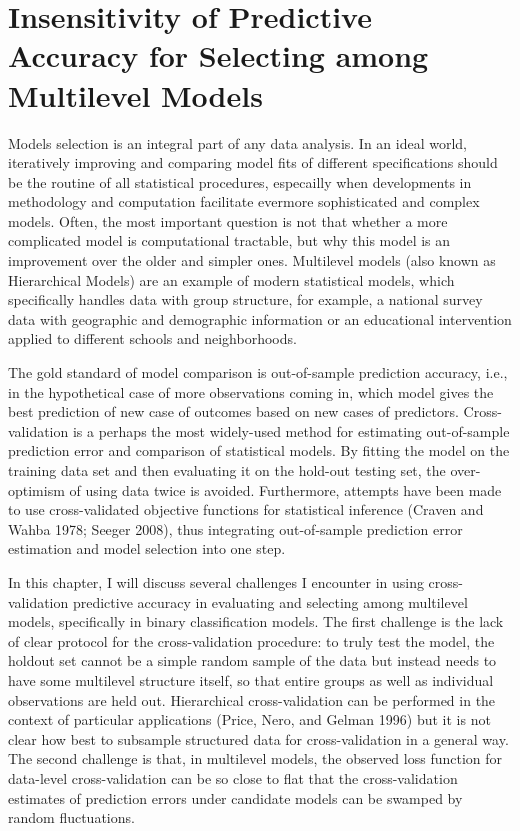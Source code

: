 \chapter{Insensitivity of Predictive Accuracy for Selecting among Multilevel
Models}
Models selection is an integral part of any data analysis. In an ideal
world, iteratively improving and comparing model fits of different
specifications should be the routine of all statistical procedures,
especailly when developments in methodology and computation facilitate
evermore sophisticated and complex models. Often, the most important
question is not that whether a more complicated model is computational
tractable, but why this model is an improvement over the older and
simpler ones. Multilevel models (also known as Hierarchical Models) are
an example of modern statistical models, which specifically handles data
with group structure, for example, a national survey data with
geographic and demographic information or an educational intervention
applied to different schools and neighborhoods.

The gold standard of model comparison is out-of-sample prediction
accuracy, i.e., in the hypothetical case of more observations coming in,
which model gives the best prediction of new case of outcomes based on
new cases of predictors. Cross-validation is a perhaps the most
widely-used method for estimating out-of-sample prediction error and
comparison of statistical models. By fitting the model on the training
data set and then evaluating it on the hold-out testing set, the
over-optimism of using data twice is avoided. Furthermore, attempts have
been made to use cross-validated objective functions for statistical
inference (Craven and Wahba 1978; Seeger 2008), thus integrating
out-of-sample prediction error estimation and model selection into one
step.

In this chapter, I will discuss several challenges I encounter in using
cross-validation predictive accuracy in evaluating and selecting among
multilevel models, specifically in binary classification models. The
first challenge is the lack of clear protocol for the cross-validation
procedure: to truly test the model, the holdout set cannot be a simple
random sample of the data but instead needs to have some multilevel
structure itself, so that entire groups as well as individual
observations are held out. Hierarchical cross-validation can be
performed in the context of particular applications (Price, Nero, and
Gelman 1996) but it is not clear how best to subsample structured data
for cross-validation in a general way. The second challenge is that, in
multilevel models, the observed loss function for data-level
cross-validation can be so close to flat that the cross-validation
estimates of prediction errors under candidate models can be swamped by
random fluctuations.

